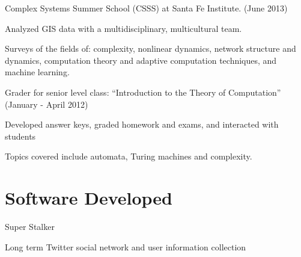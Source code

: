 \documentclass[margin,line]{res}
\newcommand{\linkToUrl}[1]{{\color{blue}\underline{\href{#1}{Link}}}}
\renewcommand{\linkToUrl}[1]{}
\newenvironment{list1}{
  \begin{list}{\ding{113}}{%
      \setlength{\itemsep}{0in}
      \setlength{\parsep}{0in} \setlength{\parskip}{0in}
      \setlength{\topsep}{0in} \setlength{\partopsep}{0in} 
      \setlength{\leftmargin}{0.17in}}}{\end{list}}
\begin{document}
\begin{resume}

Complex Systems Summer School (CSSS) at Santa Fe Institute. (June 2013)
\begin{list1}
\item[] Analyzed GIS data with a multidisciplinary, multicultural team.
\item[] Surveys of the fields of: complexity, nonlinear dynamics, network structure and dynamics, computation theory and adaptive computation techniques, and machine learning.
\end{list1}


Grader for senior level class: ``Introduction to the Theory of Computation'' (January - April 2012)
\begin{list1}
\item[] Developed answer keys, graded homework and exams, and interacted with students
\item[] Topics covered include automata, Turing machines and complexity.
\end{list1}




\section{\sc Software Developed}
Super Stalker
\begin{list1}
\item[] Long term Twitter social network and user information collection
\end{list1}


\end{resume}
\end{document}
